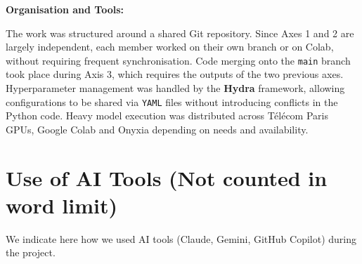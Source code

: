 \documentclass[11pt,a4paper]{article}
\begin{document}
\textbf{Organisation and Tools:}

The work was structured around a shared Git repository. Since Axes 1 and 2 are
largely independent, each member worked on their own branch or on Colab, without
requiring frequent synchronisation. Code merging onto the \texttt{main} branch
took place during Axis 3, which requires the outputs of the two previous axes.
Hyperparameter management was handled by the \textbf{Hydra} framework, allowing
configurations to be shared via \texttt{YAML} files without introducing conflicts
in the Python code. Heavy model execution was distributed across Télécom Paris
GPUs, Google Colab and Onyxia depending on needs and availability.




\section{Use of AI Tools (Not counted in word limit)}

We indicate here how we used AI tools
(Claude, Gemini, GitHub Copilot) during the project.
\end{document}
